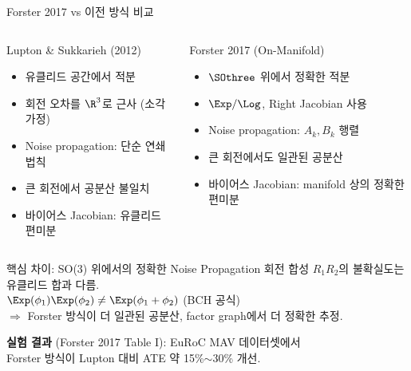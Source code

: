 \begin{frame}{Forster 2017 vs 이전 방식 비교}

  \begin{columns}
    \begin{block}{Lupton \& Sukkarieh (2012)}
      \begin{itemize}
        \item 유클리드 공간에서 적분
        \item 회전 오차를 $\R^3$로 근사 (소각 가정)
        \item Noise propagation: 단순 연쇄 법칙
        \item 큰 회전에서 공분산 불일치
        \item 바이어스 Jacobian: 유클리드 편미분
      \end{itemize}
    \end{block}
    \begin{exampleblock}{Forster 2017 (On-Manifold)}
      \begin{itemize}
        \item $\SOthree$ 위에서 정확한 적분
        \item $\Exp/\Log$, Right Jacobian 사용
        \item Noise propagation: $A_k, B_k$ 행렬
        \item 큰 회전에서도 일관된 공분산
        \item 바이어스 Jacobian: manifold 상의 정확한 편미분
      \end{itemize}
    \end{exampleblock}
  \end{columns}

  \pause
  \vspace{0.5em}
  \begin{alertblock}{핵심 차이: SO(3) 위에서의 정확한 Noise Propagation}
    회전 합성 $R_1 R_2$의 불확실도는 유클리드 합과 다름.\\
    $\Exp(\phi_1)\Exp(\phi_2) \neq \Exp(\phi_1 + \phi_2)$ (BCH 공식)\\
    $\Rightarrow$ Forster 방식이 더 일관된 공분산, factor graph에서 더 정확한 추정.
  \end{alertblock}

  \pause
  \vspace{0.2em}
  \begin{center}\footnotesize
    \textbf{실험 결과} (Forster 2017 Table I): EuRoC MAV 데이터셋에서\\
    Forster 방식이 Lupton 대비 ATE 약 15\%$\sim$30\% 개선.
  \end{center}
\end{frame}

